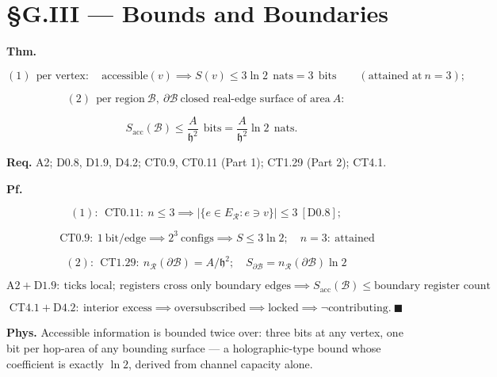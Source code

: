 \section[§G.III — Bounds and Boundaries]{\texorpdfstring{§G.III — Bounds and Boundaries}{SG.III - Bounds and Boundaries}}

\begin{theorem}\label{tag:CT4-9}
\textbf{Thm.}

\[
(1)\ \ \text{per vertex}:\quad\text{accessible}(v)\implies S(v)\le3\ln2\ \ \text{nats}=3\ \ \text{bits}\qquad(\text{attained at}\ n=3);
\]

\[
(2)\ \ \text{per region}\ \mathcal B,\ \partial\mathcal B\ \text{closed real-edge surface of area}\ A:
\]

\[
\quad S_{\mathrm{acc}}(\mathcal B)\le\frac{A}{\mathfrak h^2}\ \ \text{bits}=\frac{A}{\mathfrak h^2}\ln2\ \ \text{nats}.
\]

\textbf{Req.} A2; D0.8, D1.9, D4.2; CT0.9, CT0.11 (Part 1); CT1.29 (Part 2); CT4.1.

\textbf{Pf.}

\[
(1):\ \ \mathrm{CT0.11}:\ n\le3\implies\bigl|\{e\in E_{\mathcal R}:e\ni v\}\bigr|\le3\ [\mathrm{D0.8}];
\]

\[
\qquad \mathrm{CT0.9}:\ 1\ \text{bit/edge}\implies2^3\ \text{configs}\implies S\le3\ln2;\quad n=3:\ \text{attained}
\]

\[
(2):\ \ \mathrm{CT1.29}:\ n_{\mathcal R}(\partial\mathcal B)=A/\mathfrak h^2;\quad S_{\partial\mathcal B}=n_{\mathcal R}(\partial\mathcal B)\ln2
\]

\[
\mathrm{A2}+\mathrm{D1.9}:\ \text{ticks local};\ \text{registers cross only boundary edges}\implies S_{\mathrm{acc}}(\mathcal B)\le\text{boundary register count}
\]

\[
\mathrm{CT4.1}+\mathrm{D4.2}:\ \text{interior excess}\implies\text{oversubscribed}\implies\text{locked}\implies\neg\text{contributing}.\ \blacksquare
\]

\textbf{Phys.} Accessible information is bounded twice over: three bits at any vertex, one bit per hop-area of any bounding surface — a holographic-type bound whose coefficient is exactly $\ln2$, derived from channel capacity alone.

\end{theorem}

